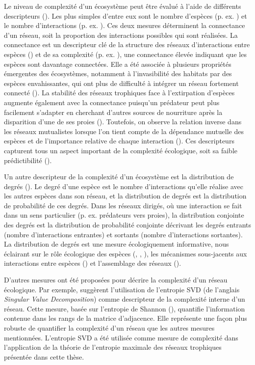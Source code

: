 Le niveau de complexité d'un écosystème peut être évalué à l'aide de différents
descripteurs (\cite{Landi2018Complexity}). Les plus simples d'entre eux sont le
nombre d'espèces (p. ex. \cite{May1972Will}) et le nombre d'interactions (p. ex.
\cite{Okuyama2008Network}). Ces deux mesures déterminent la connectance d'un
réseau, soit la proportion des interactions possibles qui sont réalisées. La
connectance est un descripteur clé de la structure des réseaux d'interactions
entre espèces (\cite{Martinez1992Constant}) et de sa complexité (p. ex.
\cite{Rozdilsky2001Complexity}), une connectance élevée indiquant que les
espèces sont davantage connectées. Elle a été associée à plusieurs propriétés
émergentes des écosystèmes, notamment à l'invasibilité des habitats par des
espèces envahissantes, qui ont plus de difficulté à intégrer un réseau fortement
connecté (\cite{Smith-Ramesh2017Global}). La stabilité des réseaux trophiques
face à l'extirpation d'espèces augmente également avec la connectance puisqu'un
prédateur peut plus facilement s'adapter en cherchant d'autres sources de
nourriture après la disparition d'une de ses proies (\cite{Dunne2002Network}).
Toutefois, on observe la relation inverse dans les réseaux mutualistes lorsque
l'on tient compte de la dépendance mutuelle des espèces et de l'importance
relative de chaque interaction (\cite{Vieira2015Simple}). Ces descripteurs
capturent tous un aspect important de la complexité écologique, soit sa faible
prédictibilité (\cite{Strydom2021Svd}). 

Un autre descripteur de la complexité d'un écosystème est la distribution de
degrés (\cite{Landi2018Complexity}). Le degré d'une espèce est le nombre
d'interactions qu'elle réalise avec les autres espèces dans son réseau, et la
distribution de degrés est la distribution de probabilité de ces degrés. Dans
les réseaux dirigés, où une interaction se fait dans un sens particulier (p. ex.
prédateurs vers proies), la distribution conjointe des degrés est la
distribution de probabilité conjointe décrivant les degrés entrants (nombre
d'interactions entrantes) et sortants (nombre d'interactions sortantes). La
distribution de degrés est une mesure écologiquement informative, nous éclairant
sur le rôle écologique des espèces (\cite{Sole2001Complexity},
\cite{Dunne2002Network}, \cite{Memmott2004Tolerance}), les mécanismes
sous-jacents aux interactions entre espèces (\cite{Williams2011Biology}) et
l'assemblage des réseaux (\cite{Vazquez2005Degree}).

D'autres mesures ont été proposées pour décrire la complexité d'un réseau
écologique. Par exemple, \cite{Strydom2021Svd} suggèrent l'utilisation de
l'entropie SVD (de l'anglais \textit{Singular Value Decomposition}) comme
descripteur de la complexité interne d'un réseau. Cette mesure, basée sur
l'entropie de Shannon (\cite{Shannon1948Mathematical}), quantifie l'information
contenue dans les rangs de la matrice d'adjacence. Elle représente une façon
plus robuste de quantifier la complexité d'un réseau que les autres mesures
mentionnées. L'entropie SVD a été utilisée comme mesure de complexité dans
l'application de la théorie de l'entropie maximale des réseaux trophiques
présentée dans cette thèse. 

